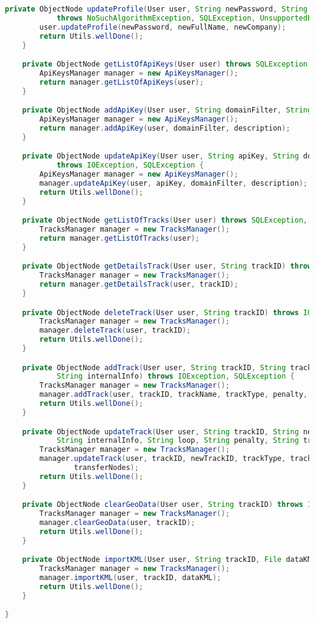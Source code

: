\begin{lstlisting}[language=Java,basicstyle=\tiny,caption=controllers/Application.java,label={lst:application.java}]
	private ObjectNode updateProfile(User user, String newPassword, String newFullName, String newCompany)
			throws NoSuchAlgorithmException, SQLException, UnsupportedEncodingException {
		user.updateProfile(newPassword, newFullName, newCompany);
		return Utils.wellDone();
	}

	private ObjectNode getListOfApiKeys(User user) throws SQLException, IOException {
		ApiKeysManager manager = new ApiKeysManager();
		return manager.getListOfApiKeys(user);
	}

	private ObjectNode addApiKey(User user, String domainFilter, String description) throws SQLException, IOException {
		ApiKeysManager manager = new ApiKeysManager();
		return manager.addApiKey(user, domainFilter, description);
	}

	private ObjectNode updateApiKey(User user, String apiKey, String domainFilter, String description)
			throws IOException, SQLException {
		ApiKeysManager manager = new ApiKeysManager();
		manager.updateApiKey(user, apiKey, domainFilter, description);
		return Utils.wellDone();
	}

	private ObjectNode getListOfTracks(User user) throws SQLException, IOException {
		TracksManager manager = new TracksManager();
		return manager.getListOfTracks(user);
	}

	private ObjectNode getDetailsTrack(User user, String trackID) throws IOException, SQLException {
		TracksManager manager = new TracksManager();
		return manager.getDetailsTrack(user, trackID);
	}

	private ObjectNode deleteTrack(User user, String trackID) throws IOException, SQLException {
		TracksManager manager = new TracksManager();
		manager.deleteTrack(user, trackID);
		return Utils.wellDone();
	}

	private ObjectNode addTrack(User user, String trackID, String trackName, String trackType, String penalty,
			String internalInfo) throws IOException, SQLException {
		TracksManager manager = new TracksManager();
		manager.addTrack(user, trackID, trackName, trackType, penalty, internalInfo);
		return Utils.wellDone();
	}

	private ObjectNode updateTrack(User user, String trackID, String newTrackID, String trackType, String trackName,
			String internalInfo, String loop, String penalty, String transferNodes) throws SQLException, IOException {
		TracksManager manager = new TracksManager();
		manager.updateTrack(user, trackID, newTrackID, trackType, trackName, internalInfo, loop, penalty,
				transferNodes);
		return Utils.wellDone();
	}

	private ObjectNode clearGeoData(User user, String trackID) throws IOException, SQLException {
		TracksManager manager = new TracksManager();
		manager.clearGeoData(user, trackID);
		return Utils.wellDone();
	}

	private ObjectNode importKML(User user, String trackID, File dataKML) throws IOException, SQLException {
		TracksManager manager = new TracksManager();
		manager.importKML(user, trackID, dataKML);
		return Utils.wellDone();
	}

}
\end{lstlisting}

